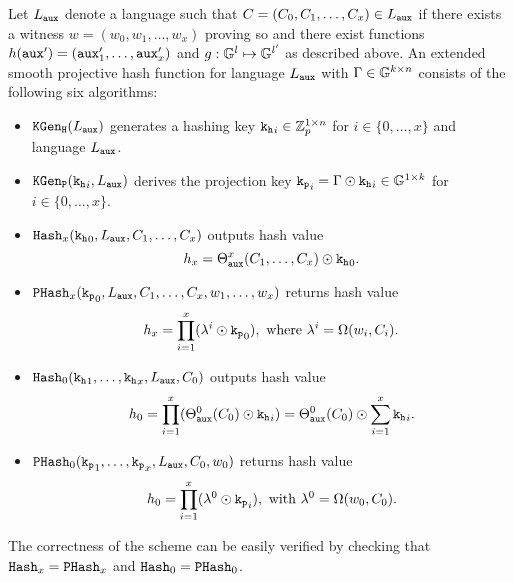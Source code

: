 \begin{definition}\label{def:symgensphf}
Let $L_\mathtt{aux}$ denote a language such that $C=(C_0,C_1,\dots,\allowbreak C_x)\in L_\mathtt{aux}$ if there exists a witness $w=(w_0,w_1,\dots,w_x)$ proving so and there exist functions $h(\mathtt{aux}')=(\mathtt{aux}'_1,\dots,\mathtt{aux}'_x)$ and $g:\mathbb{G}^l\mapsto\mathbb{G}^{l'}$ as described above.
An extended smooth projective hash function for language $L_\mathtt{aux}$ with $\Gamma\in\mathbb{G}^{k\times n}$ consists of the following six algorithms:

\begin{itemize}
	\item $\mathtt{KGen_H}(L_\mathtt{aux})$ generates a hashing key $\mathtt{k_h}_i\in\mathbb{Z}_p^{1\times n}$ for $i\in\{0,\dots,x\}$ and language $L_\mathtt{aux}$.
	
	\item $\mathtt{KGen_P}(\mathtt{k_h}_i,L_\mathtt{aux})$ derives the projection key $\mathtt{k_p}_i=\Gamma \odot \mathtt{k_h}_i\in\mathbb{G}^{1\times k}$ for $i\in\{0,\dots,x\}$.
	
	\item $\mathtt{Hash}_x(\mathtt{k_h}_0,L_\mathtt{aux},C_1,\dots,C_x)$ outputs hash value
	\[h_x=\Theta^x_{\mathtt{aux}}(C_1,\dots,C_x)\odot\mathtt{k_h}_0.\]
	
	\item $\mathtt{PHash}_x(\mathtt{k_p}_0,L_\mathtt{aux},C_1,\dots,C_x,w_1,\dots,w_x)$ returns hash value
	\[h_x=\prod^{x}_{i=1}(\lambda^i\odot \mathtt{k_p}_0), \text{ where } \lambda^i=\Omega(w_i,C_i).\]
	
	\item $\mathtt{Hash}_0(\mathtt{k_h}_1,\dots,\mathtt{k_h}_x,L_\mathtt{aux},C_0)$ outputs hash value
	\[h_0=\prod^{x}_{i=1}(\Theta_{\mathtt{aux}}^0(C_0)\odot\mathtt{k_h}_i)=\Theta_{\mathtt{aux}}^0(C_0)\odot \sum^x_{i=1}\mathtt{k_h}_i.\]
	
	\item $\mathtt{PHash}_0(\mathtt{k_p}_1,\dots,\mathtt{k_p}_x,L_\mathtt{aux},C_0,w_0)$ returns hash value
	\[h_0=\prod^{x}_{i=1}(\lambda^0\odot \mathtt{k_p}_i), \text{ with } \lambda^0=\Omega(w_0,C_0).\] \eod
\end{itemize}
\end{definition}

\noindent
The correctness of the scheme can be easily verified by checking that $\mathtt{Hash}_x=\mathtt{PHash}_x$ and $\mathtt{Hash}_0=\mathtt{PHash}_0$.

